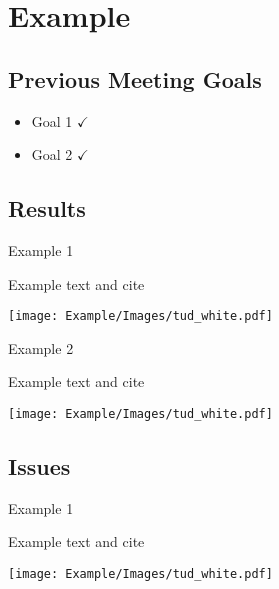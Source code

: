 \section{Example}



\subsection{Previous Meeting Goals}
\begin{frame}{}
\centering
\begin{minipage}{0.6\textwidth}
		\begin{itemize}
        \centering
			\item Goal 1 $\checkmark$
			\item Goal 2 $\checkmark$
		\end{itemize}
	\end{minipage}
\end{frame}



\subsection{Results}
\begin{frame}{Example 1}
    \begin{minipage}{0.5\textwidth}
    Example text and cite \cite{Bessa2017a}
    \end{minipage}%
    \colorbox{blue!20}{\begin{minipage}{0.5\textwidth}
        \texttt{[image: Example/Images/tud\_white.pdf]}   
    \end{minipage}}
\end{frame}

\begin{frame}{Example 2}
\begin{minipage}{0.5\textwidth}
	Example text and cite \cite{Bessa2017a}
\end{minipage}%
\colorbox{red!20}{\begin{minipage}{0.5\textwidth}
		\texttt{[image: Example/Images/tud\_white.pdf]}   
\end{minipage}}
\end{frame}



\subsection{Issues}
\begin{frame}{Example 1}
	\begin{minipage}{0.5\textwidth}
		Example text and cite \cite{Bessa2017a}
	\end{minipage}%
	\colorbox{blue!20}{\begin{minipage}{0.5\textwidth}
			\texttt{[image: Example/Images/tud\_white.pdf]}   
	\end{minipage}}
\end{frame}

